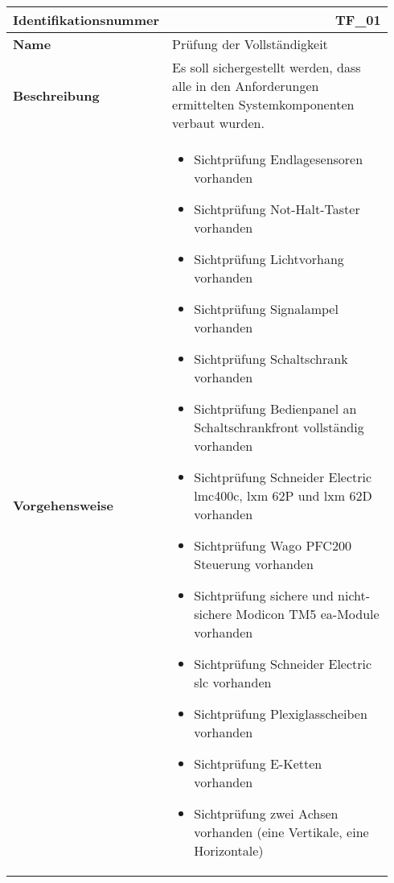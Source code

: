 \documentclass[../../../Bachelorarbeit.tex]{subfiles}
\begin{document}
\begin{table}[H]
    \centering
    \begin{tabular}{ p{0.34\linewidth}  p{0.6\linewidth} }
        \hline
        \textbf{Identifikationsnummer}  & \multicolumn{1}{r}{TF\_01} \\ \hline
        \textbf{Name}                   & Prüfung der Vollständigkeit \\
        \textbf{Beschreibung}           & Es soll sichergestellt werden, dass alle in den Anforderungen ermittelten Systemkomponenten verbaut wurden. \\
        \textbf{Vorgehensweise}         &   {\begin{itemize}[noitemsep,topsep=0pt,parsep=0pt,partopsep=0pt,leftmargin=*]
                                                \item Sichtprüfung Endlagesensoren vorhanden
                                                \item Sichtprüfung Not-Halt-Taster vorhanden
                                                \item Sichtprüfung Lichtvorhang vorhanden
                                                \item Sichtprüfung Signalampel vorhanden
                                                \item Sichtprüfung Schaltschrank vorhanden
                                                \item Sichtprüfung Bedienpanel an Schaltschrankfront vollständig vorhanden
                                                \item Sichtprüfung Schneider Electric \acs{lmc}400c, \acs{lxm} 62P und \acs{lxm} 62D vorhanden
                                                \item Sichtprüfung Wago PFC200 Steuerung vorhanden
                                                \item Sichtprüfung sichere und nicht-sichere Modicon TM5 \acs{ea}-Module vorhanden
                                                \item Sichtprüfung Schneider Electric \acs{slc} vorhanden
                                                \item Sichtprüfung Plexiglasscheiben vorhanden
                                                \item Sichtprüfung E-Ketten vorhanden
                                                \item Sichtprüfung zwei Achsen vorhanden (eine Vertikale, eine Horizontale)

\end{itemize}}
\end{tabular}
\end{table}
\end{document}
